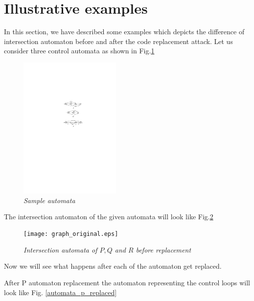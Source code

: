 \section{Illustrative examples} \label{sec5}
In this section, we have described some examples which depicts the difference of intersection
automaton before and after the code replacement attack. 
Let us consider three control automata as shown in Fig.\ref{automata_orginal}

\begin{figure}
\begin{center}
\includegraphics[width=50mm]{Automaton_original.pdf}
\end{center}
\caption{{\em Sample automata}}
\label{automata_orginal}
\end{figure}

The intersection automaton of the given automata will look like Fig.\ref{graph_orginal}

\begin{figure}
\begin{center}
\texttt{[image: graph\_original.eps]}
\end{center}
\caption{{\em Intersection automata of $P, Q$ and $R$ before replacement}}
\label{graph_orginal}
\end{figure}

Now we will see  what happens after each of the automaton get replaced.

After P automaton replacement the automaton representing the control 
loops will look like Fig. \ref{automata_p_replaced}

